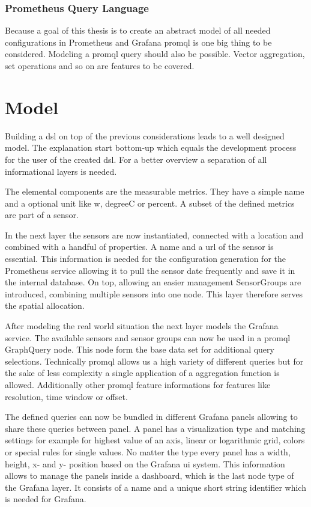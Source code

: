 \subsubsection{Prometheus Query Language}
Because a goal of this thesis is to create an abstract model of all needed configurations in Prometheus and Grafana \gls{promql} is one big thing to be considered. Modeling a \gls{promql} query should also be possible. Vector aggregation, set operations and so on are features to be covered. 


\section{Model}

Building a \gls{dsl} on top of the previous considerations leads to a well designed model. The explanation start bottom-up which equals the development process for the user of the created \gls{dsl}. For a better overview a separation of all informational layers is needed.

The elemental components are the measurable metrics. They have a simple name and a optional unit like \gls{w}, \gls{degreeC} or \gls{percent}. A subset of the defined metrics are part of a sensor.

In the next layer the sensors are now instantiated, connected with a location and combined with a handful of properties. A name and a \gls{url} of the sensor is essential. This information is needed for the configuration generation for the Prometheus service allowing it to pull the sensor date frequently and save it in the internal database. On top, allowing an easier management SensorGroups are introduced, combining multiple sensors into one node. This layer therefore serves the spatial allocation. 

After modeling the real world situation the next layer models the Grafana service. The available sensors and sensor groups can now be used in a \gls{promql} GraphQuery node. This node form the base data set for additional query selections. Technically \gls{promql} allows us a high variety of different queries but for the sake of less complexity a single application of a aggregation function is allowed. Additionally other \gls{promql} feature informations for features like resolution, time window or offset. 

The defined queries can now be bundled in different Grafana panels allowing to share these queries between panel. A panel has a visualization type and matching settings for example for highest value of an axis, linear or logarithmic grid, colors or special rules for single values. No matter the type every panel has a width, height, x- and y- position based on the Grafana \gls{ui} system. This information allows to manage the panels inside a dashboard, which is the last node type of the Grafana layer. It consists of a name and a unique short string identifier which is needed for Grafana. 

